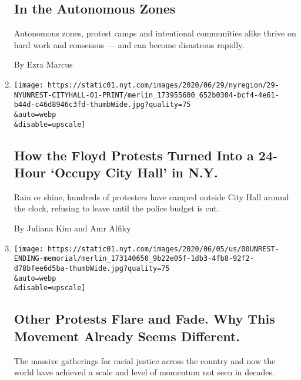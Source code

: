 \begin{enumerate}
  \hypertarget{in-the-autonomous-zones}{%
  \subsection{In the Autonomous Zones}\label{in-the-autonomous-zones}}

  Autonomous zones, protest camps and intentional communities alike
  thrive on hard work and consensus --- and can become disastrous
  rapidly.

  By Ezra Marcus
\item
  \href{/2020/06/28/nyregion/occupy-city-hall-nyc.html}{}

  \texttt{[image: https://static01.nyt.com/images/2020/06/29/nyregion/29-NYUNREST-CITYHALL-01-PRINT/merlin\_173955600\_652b0304-bcf4-4e61-b44d-c46d8946c3fd-thumbWide.jpg?quality=75\\\&auto=webp\\\&disable=upscale]}

  \hypertarget{how-the-floyd-protests-turned-into-a-24-hour-occupy-city-hall-in-ny}{%
  \subsection{How the Floyd Protests Turned Into a 24-Hour `Occupy City
  Hall' in
  N.Y.}\label{how-the-floyd-protests-turned-into-a-24-hour-occupy-city-hall-in-ny}}

  Rain or shine, hundreds of protesters have camped outside City Hall
  around the clock, refusing to leave until the police budget is cut.

  By Juliana Kim and Amr Alfiky
\item
  \href{/2020/06/07/us/unrest-protests-minneapolis-ending.html}{}

  \texttt{[image: https://static01.nyt.com/images/2020/06/05/us/00UNREST-ENDING-memorial/merlin\_173140650\_9b22e05f-1db3-4fb8-92f2-d78bfee6d5ba-thumbWide.jpg?quality=75\\\&auto=webp\\\&disable=upscale]}

  \hypertarget{other-protests-flare-and-fade-why-this-movement-already-seems-different}{%
  \subsection{Other Protests Flare and Fade. Why This Movement Already
  Seems
  Different.}\label{other-protests-flare-and-fade-why-this-movement-already-seems-different}}

  The massive gatherings for racial justice across the country and now
  the world have achieved a scale and level of momentum not seen in
  decades.


\end{enumerate}
